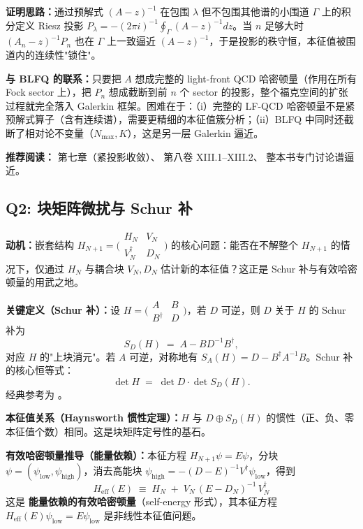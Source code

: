 \documentclass{article}
\begin{document}
\textbf{证明思路：}通过预解式 $(A-z)^{-1}$ 在包围 $\lambda$ 但不包围其他谱的小围道 $\Gamma$ 上的积分定义 Riesz 投影 $P_{\lambda}=-(2\pi i)^{-1}\oint_{\Gamma}(A-z)^{-1}dz$。当 $n$ 足够大时 $(A_{n}-z)^{-1}P_{n}$ 也在 $\Gamma$ 上一致逼近 $(A-z)^{-1}$，于是投影的秩守恒，本征值被围道内的连续性"锁住"。

\textbf{与 BLFQ 的联系：}只要把 $A$ 想成完整的 light-front QCD 哈密顿量（作用在所有 Fock sector 上），把 $P_{n}$ 想成截断到前 $n$ 个 sector 的投影，整个福克空间的扩张过程就完全落入 Galerkin 框架。困难在于：（i）完整的 LF-QCD 哈密顿量不是紧预解式算子（含有连续谱），需要更精细的本征值簇分析；（ii）BLFQ 中同时还截断了相对论不变量（$N_{\max},K$），这是另一层 Galerkin 逼近。

\textbf{推荐阅读：}\cite{Kato_1976} 第七章（紧投影收敛）、\cite{Reed_Simon_1978} 第八卷 XIII.1--XIII.2、\cite{Chatelin_1983} 整本书专门讨论谱逼近。

\subsection{Q2: 块矩阵微扰与 Schur 补}

\textbf{动机：}嵌套结构 $H_{N+1}=\bigl(\begin{smallmatrix} H_{N}&V_{N}\\ V_{N}^{\dagger}&D_{N}\end{smallmatrix}\bigr)$ 的核心问题：能否在不解整个 $H_{N+1}$ 的情况下，仅通过 $H_{N}$ 与耦合块 $V_{N},D_{N}$ 估计新的本征值？这正是 Schur 补与有效哈密顿量的用武之地。

\textbf{关键定义（Schur 补）：}设 $H=\bigl(\begin{smallmatrix} A&B\\B^{\dagger}&D\end{smallmatrix}\bigr)$，若 $D$ 可逆，则 $D$ 关于 $H$ 的 Schur 补为
\[
S_{D}(H) \;=\; A - B D^{-1} B^{\dagger},
\]
对应 $H$ 的"上块消元"。若 $A$ 可逆，对称地有 $S_{A}(H)=D-B^{\dagger}A^{-1}B$。Schur 补的核心恒等式：
\[
\det H \;=\; \det D\cdot\det S_{D}(H).
\]
经典参考为 \cite{Zhang_2005_Schur}。

\textbf{本征值关系（Haynsworth 惯性定理）：}$H$ 与 $D\oplus S_{D}(H)$ 的惯性（正、负、零本征值个数）相同。这是块矩阵定号性的基石。

\textbf{有效哈密顿量推导（能量依赖）：}本征方程 $H_{N+1}\psi=E\psi$，分块 $\psi=(\psi_{\mathrm{low}},\psi_{\mathrm{high}})$，消去高能块 $\psi_{\mathrm{high}}=-(D-E)^{-1}V^{\dagger}\psi_{\mathrm{low}}$，得到
\[
\boxed{\;H_{\mathrm{eff}}(E)\;\equiv\;H_{N} \;+\; V_{N}\,(E-D_{N})^{-1}\,V_{N}^{\dagger}\;}
\]
这是 \textbf{能量依赖的有效哈密顿量}（self-energy 形式），其本征方程 $H_{\mathrm{eff}}(E)\psi_{\mathrm{low}}=E\psi_{\mathrm{low}}$ 是非线性本征值问题。
\end{document}
